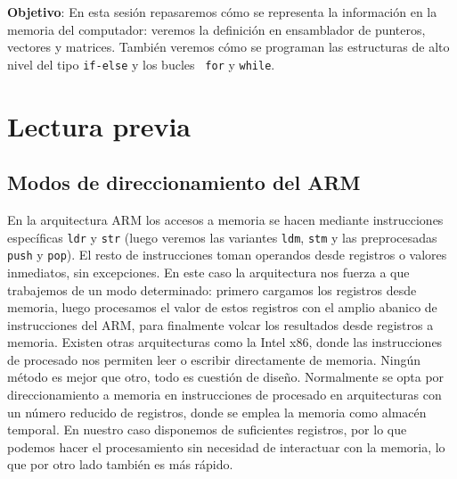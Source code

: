 

\label{chp:TipDat}
\minitoc

{\bf Objetivo}:
En esta sesión repasaremos cómo se representa la
información en la memoria del computador: veremos la definición en
ensamblador de punteros, vectores y matrices. También veremos cómo se programan las
estructuras de alto nivel del tipo {\tt if-else} y los bucles {\tt
for} y {\tt while}.

\section{Lectura previa}

\subsection{Modos de direccionamiento del ARM}

En la arquitectura ARM los accesos a memoria se hacen mediante instrucciones
específicas {\tt ldr} y {\tt str} (luego veremos las variantes {\tt ldm},
{\tt stm} y las preprocesadas {\tt push} y {\tt pop}). El resto de instrucciones
toman operandos desde registros o valores inmediatos, sin excepciones. En este
caso la arquitectura nos fuerza a que trabajemos de un modo determinado: primero
cargamos los registros desde memoria, luego procesamos el valor de estos registros
con el amplio abanico de instrucciones del ARM, para finalmente volcar los
resultados desde registros a memoria. Existen otras arquitecturas como la Intel x86,
donde las instrucciones de procesado nos permiten leer o escribir directamente
de memoria. Ningún método es mejor que otro, todo es cuestión de diseño. Normalmente
se opta por direccionamiento a memoria en instrucciones de procesado en arquitecturas
con un número reducido de registros, donde se emplea la memoria como almacén
temporal. En nuestro caso disponemos de suficientes registros, por lo que podemos
hacer el procesamiento sin necesidad de interactuar con la memoria, lo que por otro
lado también es más rápido.


